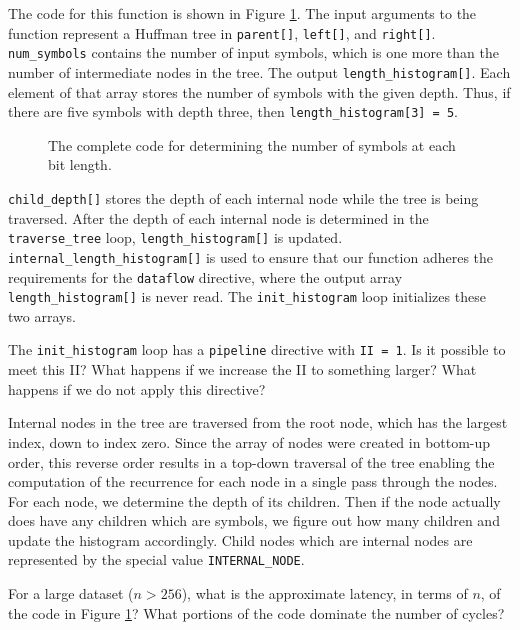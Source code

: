 The code for this function is shown in Figure \ref{fig:huffman_compute_bit_length.cpp}.  The input arguments to the function represent a Huffman tree in \lstinline{parent[]}, \lstinline{left[]}, and \lstinline{right[]}.   \lstinline{num_symbols} contains the number of input symbols, which is one more than the number of intermediate nodes in the tree.  The output \lstinline{length_histogram[]}.  Each element of that array stores the number of symbols with the given depth. Thus, if there are five symbols with depth three, then \lstinline{length_histogram[3] = 5}. 
\begin{figure}

\caption{The complete code for determining the number of symbols at each bit length.}
\label{fig:huffman_compute_bit_length.cpp}
\end{figure}

\lstinline{child_depth[]} stores the depth of each internal node while the tree is being traversed.  After the depth of each internal node is determined in the \lstinline{traverse_tree} loop, \lstinline{length_histogram[]} is updated.  \lstinline{internal_length_histogram[]} is used to ensure that our function adheres the requirements for the \lstinline{dataflow} directive, where the output array \lstinline{length_histogram[]} is never read.  The \lstinline{init_histogram} loop initializes these two arrays.

\begin{exercise}
The \lstinline{init_histogram} loop has a \lstinline{pipeline} directive with \lstinline{II = 1}. Is it possible to meet this II? What happens if we increase the II to something larger? What happens if we do not apply this directive?
\end{exercise}

Internal nodes in the tree are traversed from the root node, which has the largest index, down to index zero.  Since the array of nodes were created in bottom-up order, this reverse order results in a top-down traversal of the tree enabling the computation of the recurrence for each node in a single pass through the nodes.  For each node, we determine the depth of its children.  Then if the node actually does have any children which are symbols, we figure out how many children and update the histogram accordingly.  Child nodes which are internal nodes are represented by the special value \lstinline{INTERNAL_NODE}.

\begin{exercise}
For a large dataset ($n > 256$), what is the approximate latency, in terms of $n$, of the code in Figure \ref{fig:huffman_compute_bit_length.cpp}?  What portions of the code dominate the number of cycles?
\end{exercise}

